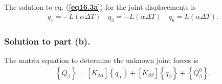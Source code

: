 \documentclass{AeroStructure-ERJohnson}
\begin{document}
\begin{example}
\begin{gather}
\end{gather}
The solution to eq. (\textbf{\ref{eq16.3a}}) for the joint displacements is
\begin{align}\label{eq16.3d}\tag{d}
q_{1}=-L(\alpha \Delta T) \quad q_{3}=-L(\alpha \Delta T) \quad q_{6}=L(\alpha \Delta T).
\end{align}

\vspace*{-1pc}

\subsubsection{Solution to part (b).} The matrix equation to determine the unknown joint forces is
\begin{align}\label{eq16.3e}\tag{e}
\left\{Q_{\beta}\right\}=\left[K_{\beta \alpha}\right]\left\{q_{\alpha}\right\}+\left[K_{\beta \beta}\right]\left\{q_{\beta}\right\}+\left\{Q_{\beta}^{0}\right\}.
\end{align}

\pagebreak


\end{example}
\end{document}
